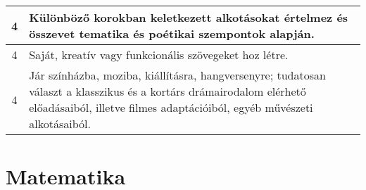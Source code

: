 \begin{longtable}{c | p{} }
                                          4 &  Különböző korokban keletkezett alkotásokat értelmez és összevet tematika és poétikai szempontok alapján. \\ \hline
                                          4 &  Saját, kreatív vagy funkcionális szövegeket hoz létre. \\ \hline
                                          4 &  Jár színházba, moziba, kiállításra, hangversenyre; tudatosan választ a klasszikus és a kortárs drámairodalom elérhető előadásaiból, illetve filmes adaptációiból, egyéb művészeti alkotásaiból. \\ \hline
                                      
                        \end{longtable}
            \clearpage

        \section{Matematika}

